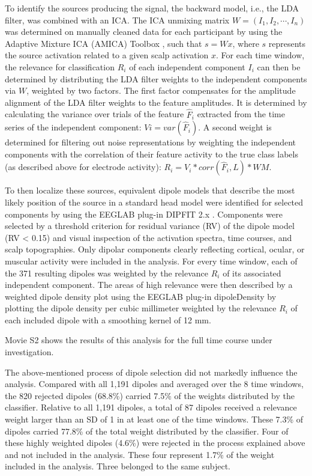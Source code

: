 To identify the sources producing the signal, the backward model, i.e., the LDA filter, was combined with an ICA. The ICA unmixing matrix $W=(I_1,I_2,\cdots,I_n)$ was determined on manually cleaned data for each participant by using the Adaptive Mixture ICA (AMICA) Toolbox \cite{palmer2012amica}, such that $s = Wx$, where $s$ represents the source activation related to a given scalp activation $x$. For each time window, the relevance for classification $R_i$ of each independent component $I_i$ can then be determined by distributing the LDA filter weights to the independent components via $W$, weighted by two factors. The first factor compensates for the amplitude alignment of the LDA filter weights to the feature amplitudes. It is determined by calculating the variance over trials of the feature $\hat{F}_i$ extracted from the time series of the independent component: $Vi = var(\hat{F}_i)$. A second weight is determined for filtering out noise representations by weighting the independent components with the correlation of their feature activity to the true class labels (as described above for electrode activity): $R_i=V_i* corr(\hat{F}_i,L) * WM$.

To then localize these sources, equivalent dipole models that describe the most likely position of the source in a standard head model were identified for selected components by using the EEGLAB plug-in DIPFIT 2.x \cite{oostenveld2003dipfit}. Components were selected by a threshold criterion for residual variance (RV) of the dipole model (RV < 0.15) and visual inspection of the activation spectra, time courses, and scalp topographies. Only dipolar components clearly reflecting cortical, ocular, or muscular activity were included in the analysis. For every time window, each of the 371 resulting dipoles was weighted by the relevance $R_i$ of its associated independent component. The areas of high relevance were then described by a weighted dipole density plot using the EEGLAB plug-in dipoleDensity \cite{miyakoshi2013dipdens} by plotting the dipole density per cubic millimeter weighted by the relevance $R_i$ of each included dipole with a smoothing kernel of 12 mm.

Movie S2 shows the results of this analysis for the full time course under investigation.

The above-mentioned process of dipole selection did not markedly influence the analysis. Compared with all 1,191 dipoles and averaged over the 8 time windows, the 820 rejected dipoles (68.8\%) carried 7.5\% of the weights distributed by the classifier. Relative to all 1,191 dipoles, a total of 87 dipoles received a relevance weight larger than an SD of 1 in at least one of the time windows. These 7.3\% of dipoles carried 77.8\% of the total weight distributed by the classifier. Four of these highly weighted dipoles (4.6\%) were rejected in the process explained above and not included in the analysis. These four represent 1.7\% of the weight included in the analysis. Three belonged to the same subject.

